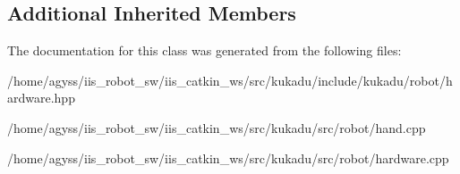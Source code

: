 \subsection*{Additional Inherited Members}


The documentation for this class was generated from the following files\+:\begin{DoxyCompactItemize}
\item 
/home/agyss/iis\+\_\+robot\+\_\+sw/iis\+\_\+catkin\+\_\+ws/src/kukadu/include/kukadu/robot/hardware.\+hpp\item 
/home/agyss/iis\+\_\+robot\+\_\+sw/iis\+\_\+catkin\+\_\+ws/src/kukadu/src/robot/hand.\+cpp\item 
/home/agyss/iis\+\_\+robot\+\_\+sw/iis\+\_\+catkin\+\_\+ws/src/kukadu/src/robot/hardware.\+cpp\end{DoxyCompactItemize}
